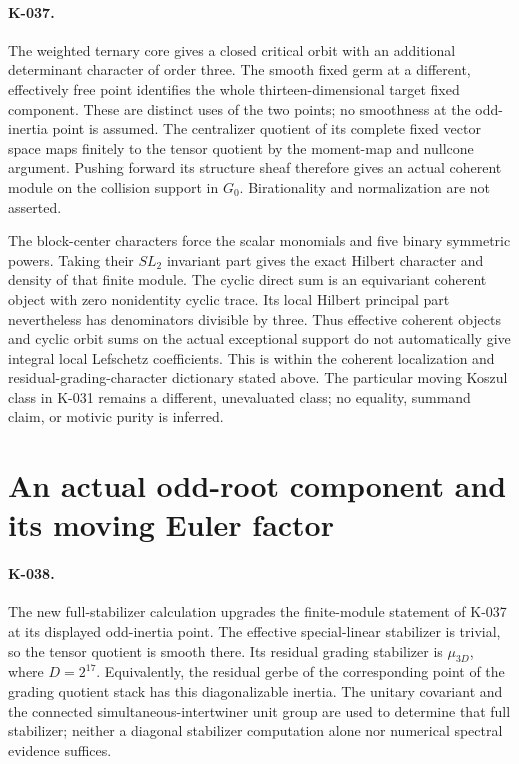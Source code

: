 \paragraph{K-037.}
The weighted ternary core gives a closed critical orbit with an
additional determinant character of order three. The smooth fixed
germ at a different, effectively free point identifies the whole
thirteen-dimensional target fixed component. These are distinct
uses of the two points; no smoothness at the odd-inertia point is
assumed. The centralizer quotient of its complete fixed vector
space maps finitely to the tensor quotient by the moment-map and
nullcone argument. Pushing forward its structure sheaf therefore
gives an actual coherent module on the collision support in $G_0$.
Birationality and normalization are not asserted.

The block-center characters force the scalar monomials and five
binary symmetric powers. Taking their $SL_2$ invariant part gives
the exact Hilbert character and density of that finite module.
The cyclic direct sum is an equivariant coherent object with
zero nonidentity cyclic trace. Its local Hilbert principal part
nevertheless has denominators divisible by three. Thus effective
coherent objects and cyclic orbit sums on the actual exceptional
support do not automatically give integral local Lefschetz
coefficients. This is within the coherent localization and
residual-grading-character dictionary stated above. The particular
moving Koszul class in K-031 remains a different, unevaluated
class; no equality, summand claim, or motivic purity is inferred.

\section{An actual odd-root component and its moving Euler factor}
\paragraph{K-038.}
The new full-stabilizer calculation upgrades the finite-module
statement of K-037 at its displayed odd-inertia point. The effective
special-linear stabilizer is trivial, so the tensor quotient is smooth
there. Its residual grading stabilizer is $\mu_{3D}$, where
$D=2^{17}$. Equivalently, the residual gerbe of the corresponding
point of the grading quotient stack has this diagonalizable inertia.
The unitary covariant and the connected simultaneous-intertwiner unit
group are used to determine that full stabilizer; neither a diagonal
stabilizer computation alone nor numerical spectral evidence suffices.

